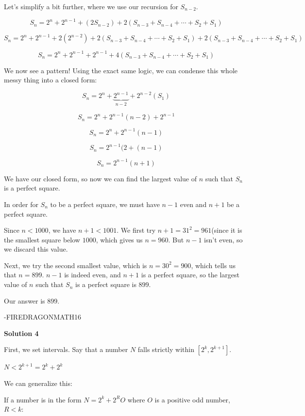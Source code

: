 \begin{enumerate}
 Let's simplify a bit further, where we use our recursion for $S_{n-2}$.

 
 \[S_n = 2^n + 2^{n-1} +(2S_{n-2}) + 2(S_{n-3} + S_{n-4} + \cdots + S_2 + S_1)\]

 \[S_n = 2^n + 2^{n-1} + 2(2^{n-2}) + 2(S_{n-3} + S_{n-4} + \cdots + S_2 + S_1) + 2(S_{n-3} + S_{n-4} + \cdots + S_2 + S_1)\]

 \[S_n = 2^n + 2^{n-1} + 2^{n-1} + 4(S_{n-3} + S_{n-4} + \cdots + S_2 + S_1)\]

 We now see a pattern! Using the exact same logic, we can condense this whole messy thing into a closed form:

 
 \[S_n = 2^n + \underbrace{2^{n-1}}_{n-2} + 2^{n-2}(S_1)\]

 \[S_n = 2^n + 2^{n-1}(n-2) + 2^{n-1}\]

 \[S_n = 2^n + 2^{n-1}(n-1)\]

 \[S_n = 2^{n-1}(2 + (n-1)\]

 \[S_n = 2^{n-1}(n+1)\]

 We have our closed form, so now we can find the largest value of $n$ such that $S_n$ is a perfect square.

 In order for $S_n$ to be a perfect square, we must have $n-1$ even and $n+1$ be a perfect square.

 Since $n<1000$, we have $n+1 < 1001$. We first try $n+1 = 31^2 = 961$(since it is the smallest square below $1000$, which gives us $n=960$. But $n-1$ isn't even, so we discard this value.

 Next, we try the second smallest value, which is $n = 30^2 = 900$, which tells us that $n=899$. $n-1$ is indeed even, and $n+1$ is a perfect square, so the largest value of $n$ such that $S_n$ is a perfect square is $899$.

 Our answer is $\boxed{899}$.

 -FIREDRAGONMATH16

 



\textbf{Solution 4}

First, we set intervals. Say that a number $N$ falls strictly within $[2^k, 2^{k+1}]$. 

 $N<2^{k+1}=2^k+2^k$

 We can generalize this:

 If a number is in the form $N=2^k+2^{R}O$ where $O$ is a positive odd number, $R<k$:


\end{enumerate}
